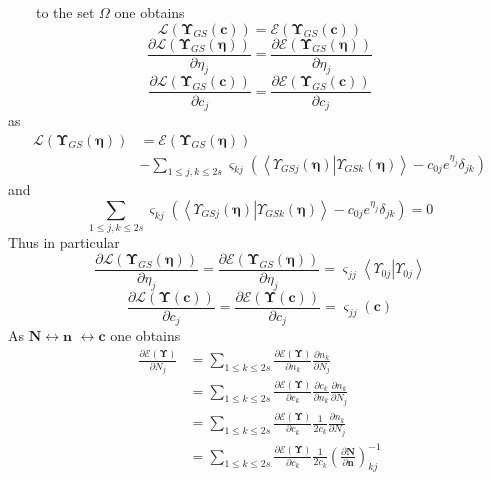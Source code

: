 \documentclass[aps,preprint]{revtex4}%
\begin{document}
$\qquad$to the set $\Omega$ one obtains%
\begin{equation}
\mathcal{L}\left(  \mathbf{\Upsilon}_{GS}\left(  \mathbf{c}\right)  \right)
=\mathcal{E}\left(  \mathbf{\Upsilon}_{GS}\left(  \mathbf{c}\right)  \right)
\end{equation}%
\[
\frac{\partial\mathcal{L}\left(  \mathbf{\Upsilon}_{GS}\left(  \mathbf{\eta
}\right)  \right)  }{\partial\eta_{j}}=\frac{\partial\mathcal{E}\left(
\mathbf{\Upsilon}_{GS}\left(  \mathbf{\eta}\right)  \right)  }{\partial
\eta_{j}}%
\]%
\[
\frac{\partial\mathcal{L}\left(  \mathbf{\Upsilon}_{GS}\left(  \mathbf{c}%
\right)  \right)  }{\partial c_{j}}=\frac{\partial\mathcal{E}\left(
\mathbf{\Upsilon}_{GS}\left(  \mathbf{c}\right)  \right)  }{\partial c_{j}}%
\]
as
\begin{align*}
\mathcal{L}\left(  \mathbf{\Upsilon}_{GS}\left(  \mathbf{\eta}\right)
\right)   &  =\mathcal{E}\left(  \mathbf{\Upsilon}_{GS}\left(  \mathbf{\eta
}\right)  \right) \\
&  -\sum_{1\leq j,k\leq2s}\varsigma_{kj}\left(  \left\langle \left.
\Upsilon_{GSj}\left(  \mathbf{\eta}\right)  \right\vert \Upsilon_{GSk}\left(
\mathbf{\eta}\right)  \right\rangle -c_{0j}e^{\eta_{j}}\delta_{jk}\right)
\end{align*}
and
\[
\sum_{1\leq j,k\leq2s}\varsigma_{kj}\left(  \left\langle \left.
\Upsilon_{GSj}\left(  \mathbf{\eta}\right)  \right\vert \Upsilon_{GSk}\left(
\mathbf{\eta}\right)  \right\rangle -c_{0j}e^{\eta_{j}}\delta_{jk}\right)  =0
\]
Thus in particular
\[
\frac{\partial\mathcal{L}\left(  \mathbf{\Upsilon}_{GS}\left(  \mathbf{\eta
}\right)  \right)  }{\partial\eta_{j}}=\frac{\partial\mathcal{E}\left(
\mathbf{\Upsilon}_{GS}\left(  \mathbf{\eta}\right)  \right)  }{\partial
\eta_{j}}=\varsigma_{jj}\left\langle \left.  \Upsilon_{0j}\right\vert
\Upsilon_{0j}\right\rangle
\]%
\[
\frac{\partial\mathcal{L}\left(  \mathbf{\Upsilon}\left(  \mathbf{c}\right)
\right)  }{\partial c_{j}}=\frac{\partial\mathcal{E}\left(  \mathbf{\Upsilon
}\left(  \mathbf{c}\right)  \right)  }{\partial c_{j}}=\varsigma_{jj}\left(
\mathbf{c}\right)
\]
As $\mathbf{N}\leftrightarrow\mathbf{n}$ $\mathbf{\leftrightarrow c}$ one
obtains
\begin{align*}
\frac{\partial\mathcal{E}\left(  \mathbf{\Upsilon}\right)  }{\partial N_{j}}
&  =\sum_{1\leq k\leq2s}\frac{\partial\mathcal{E}\left(  \mathbf{\Upsilon
}\right)  }{\partial n_{k}}\frac{\partial n_{k}}{\partial N_{j}}\\
&  =\sum_{1\leq k\leq2s}\frac{\partial\mathcal{E}\left(  \mathbf{\Upsilon
}\right)  }{\partial c_{k}}\frac{\partial c_{k}}{\partial n_{k}}\frac{\partial
n_{k}}{\partial N_{j}}\\
&  =\sum_{1\leq k\leq2s}\frac{\partial\mathcal{E}\left(  \mathbf{\Upsilon
}\right)  }{\partial c_{k}}\frac{1}{2c_{k}}\frac{\partial n_{k}}{\partial
N_{j}}\\
&  =\sum_{1\leq k\leq2s}\frac{\partial\mathcal{E}\left(  \mathbf{\Upsilon
}\right)  }{\partial c_{k}}\frac{1}{2c_{k}}\left(  \frac{\partial\mathbf{N}%
}{\partial\mathbf{n}}\right)  _{kj}^{-1}%
\end{align*}
\end{document}
